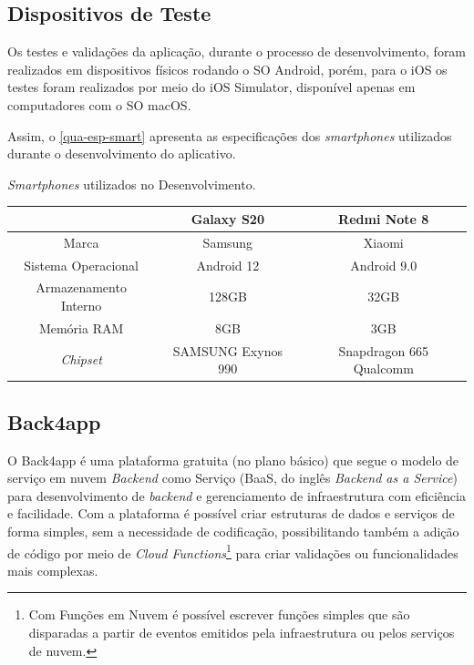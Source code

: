 \newpage

\subsection{Dispositivos de Teste}

Os testes e validações da aplicação, durante o processo de desenvolvimento, foram realizados em dispositivos físicos
rodando o SO Android, porém, para o iOS os testes foram realizados por meio do iOS Simulator, disponível apenas em
computadores com o SO macOS.

Assim, o \autoref{qua-esp-smart} apresenta as especificações dos \emph{smartphones} utilizados durante o desenvolvimento
do aplicativo.

\begin{quadro}[htb!]
    \begin{center}
        \ABNTEXfontereduzida
        \caption{\label{qua-esp-smart}\emph{Smartphones} utilizados no Desenvolvimento.}
        \begin{tabular}{|c|c|c|}
            \hline
                                  & \textbf{Galaxy S20} & \textbf{Redmi Note 8}   \\
            \hline
            Marca                 & Samsung             & Xiaomi                  \\
            \hline
            Sistema Operacional   & Android 12          & Android 9.0             \\
            \hline
            Armazenamento Interno & 128GB               & 32GB                    \\
            \hline
            Memória RAM           & 8GB                 & 3GB                     \\
            \hline
            \emph{Chipset}        & SAMSUNG Exynos 990  & Snapdragon 665 Qualcomm \\
            \hline
        \end{tabular}
    \end{center}
\end{quadro}

\subsection{Back4app}

O Back4app é uma plataforma gratuita (no plano básico) que segue o modelo de serviço em nuvem \emph{Backend} como Serviço (BaaS, do inglês \emph{Backend as a Service})
para desenvolvimento de \emph{backend} e gerenciamento de infraestrutura com eficiência e facilidade. Com a plataforma é possível
criar estruturas de dados e serviços de forma simples, sem a necessidade de codificação, possibilitando também a adição de código por meio de \emph{Cloud
    Functions}\footnote{Com Funções em Nuvem é possível escrever funções simples que são disparadas a partir de eventos emitidos
    pela infraestrutura ou pelos serviços de nuvem.} para criar validações ou funcionalidades mais complexas.

